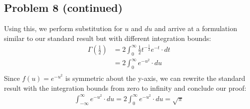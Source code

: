 \documentclass[12pt]{article}
\theoremstyle{definition}
\begin{document}
\newpage
\subsection*{Problem 8 (continued)}
Using this, we perform substitution for $u$ and $du$ and arrive at a formulation similar to our standard result but with different integration bounds:
\begin{align*}
\Gamma \left ( \frac{1}{2} \right ) &= 2 \int_0^\infty \frac{1}{2}t^{-\frac{1}{2}}e^{-t} \cdot dt\\
&= 2\int_0^\infty e^{-u^2}\cdot du\\
\end{align*}
Since $f(u) = e^{-u^2}$ is symmetric about the y-axis, we can rewrite the standard result with the integration bounds from zero to infinity and conclude our proof:
\begin{align*}
\int_{-\infty}^\infty e^{-u^2} \cdot du = 2\int_0^\infty e^{-u^2} \cdot du= \sqrt{\pi}
\end{align*}
\end{document}
